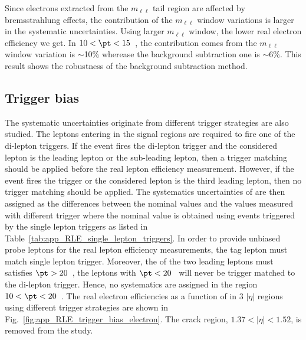 Since electrons extracted from the $m_{\ell \ell}$ tail region are affected by bremsstrahlung effects, the contribution of the $m_{\ell \ell}$ window variations is larger in the systematic uncertainties.
Using larger $m_{\ell \ell}$ window, the lower real electron efficiency we get.
In $10 < \pt < 15$~{\GeV}, the contribution comes from the $m_{\ell\ell}$ window variation is $\sim$10\% wherease the background subtraction one is $\sim$6\%.
This result shows the robustness of the background subtraction method.


\subsection{Trigger bias}
\label{subsec:app_RLE_trigger_bias}
The systematic uncertainties originate from different trigger strategies are also studied.
The leptons entering in the signal regions are required to fire one of the di-lepton triggers.
If the event fires the di-lepton trigger and the considered lepton is the leading lepton or the sub-leading lepton, then a trigger matching should be applied before the real lepton efficiency measurement.
However, if the event fires the \met trigger or the considered lepton is the third leading lepton, then no trigger matching should be applied.
The systematics uncertainties of are then assigned as the differences between the nominal values and the values measured with different trigger where the nominal value is obtained using events triggered by the single lepton triggers as listed in Table~\ref{tab:app_RLE_single_lepton_triggers}.
In order to provide unbiased probe leptons for the real lepton efficiency measurements, the tag lepton must match single lepton trigger.
Moreover, the \pt of the two leading leptons must satisfies $\pt > 20$~{\GeV}, the leptons with $\pt < 20$~{\GeV} will never be trigger matched to the di-lepton trigger.
Hence, no systematics are assigned in the region $10 < \pt < 20$~{\GeV}.
The real electron efficiencies as a function of \pt in 3 $|\eta|$ regions using different trigger strategies are shown in Fig.~\ref{fig:app_RLE_trigger_bias_electron}.
The crack region, $1.37<|\eta|<1.52$, is removed from the study.

